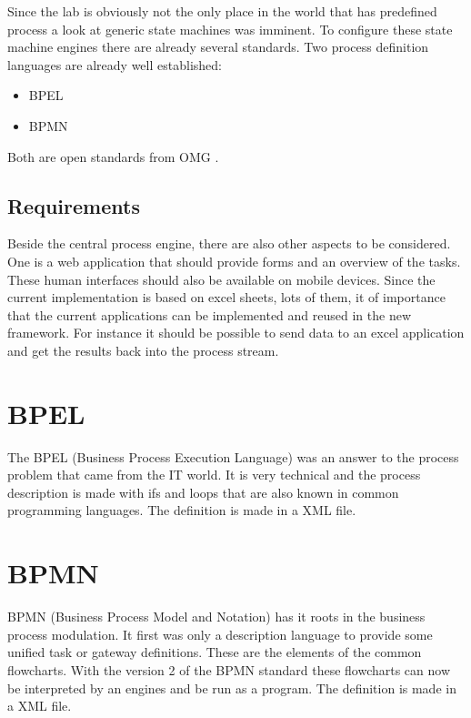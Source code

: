 \documentclass[paper=a4,twoside=false,BCOR=0mm,DIV=calc,fontsize=12pt]{scrartcl}
\begin{document}
Since the lab is obviously not the only place in the world that has predefined process a look at generic state machines was imminent.
To configure these state  machine engines there are already several standards. Two process definition languages are already well established:

\begin{itemize}
 \item BPEL
 \item BPMN
\end{itemize}

Both are open standards from OMG \cite{omg}.


\subsection{Requirements}
Beside the central process engine, there are also other aspects to be considered. One is a web application that should provide forms and an overview
of the tasks. These human interfaces should also be available on mobile devices.
Since the current implementation is based on excel sheets, lots of them, it of importance that the current applications can be implemented and reused in the new framework.
For instance it should be possible to send data to an excel application and get the results back into the process stream.



\section{BPEL}
The BPEL (Business Process Execution Language) \cite{bpel} was an answer to the process problem that came from the IT world. It is very technical and the process description is made with ifs and loops that are also known in common programming languages. The definition is made in a XML file. 

\section{BPMN}
BPMN (Business Process Model and Notation) \cite{bpmn} has it roots in the business process modulation. It first was only a description language to provide some unified task or gateway definitions. These are the elements of the common flowcharts. 
With the version 2 of the BPMN standard these flowcharts can now be interpreted by an engines and be run as a program.
The definition is made in a XML file. 
\end{document}

